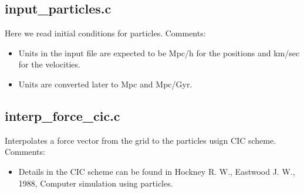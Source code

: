 \documentclass[letterpaper,10pt,english]{sphinxmanual}
\begin{document}
\subsection{input\_particles.c}
\label{\detokenize{sphinx-c-apidoc/output/pm/input_particles_c:input-particles-c}}\label{\detokenize{sphinx-c-apidoc/output/pm/input_particles_c::doc}}
Here we read initial conditions for particles.
Comments:
\begin{itemize}
\item {} 
Units in the input file are expected to be Mpc/h for the positions and km/sec for the velocities.

\item {} 
Units are converted later to Mpc and Mpc/Gyr.

\end{itemize}

\begin{fulllineitems}
\label{\detokenize{sphinx-c-apidoc/output/pm/input_particles_c:c.read_particles}}%
\pysigstartmultiline
{}%
\pysigstopmultiline
\end{fulllineitems}



\subsection{interp\_force\_cic.c}
\label{\detokenize{sphinx-c-apidoc/output/pm/interp_force_cic_c:interp-force-cic-c}}\label{\detokenize{sphinx-c-apidoc/output/pm/interp_force_cic_c::doc}}
Interpolates a force vector from the grid to the particles usign CIC scheme.
Comments:
\begin{itemize}
\item {} 
Details in the CIC scheme can be found in
Hockney R. W., Eastwood J. W., 1988, Computer simulation using particles.

\end{itemize}
\end{document}
